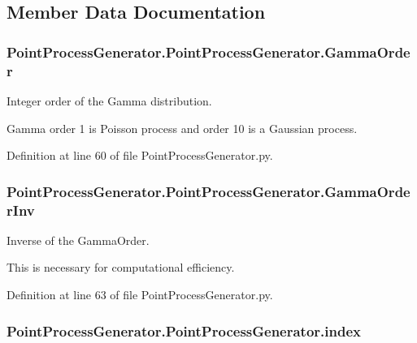 \subsection{Member Data Documentation}
\hypertarget{class_point_process_generator_1_1_point_process_generator_aa6c6513cd7f00dbdceb5f945a07cffee}{
\subsubsection[{Gamma\-Order}]{\setlength{\rightskip}{0pt plus 5cm}Point\-Process\-Generator.\-Point\-Process\-Generator.\-Gamma\-Order}}\label{class_point_process_generator_1_1_point_process_generator_aa6c6513cd7f00dbdceb5f945a07cffee}


Integer order of the Gamma distribution. 

Gamma order 1 is Poisson process and order 10 is a Gaussian process. 

Definition at line 60 of file Point\-Process\-Generator.\-py.

\hypertarget{class_point_process_generator_1_1_point_process_generator_aa70be756b1535ff4512affa05a732fda}{
\subsubsection[{Gamma\-Order\-Inv}]{\setlength{\rightskip}{0pt plus 5cm}Point\-Process\-Generator.\-Point\-Process\-Generator.\-Gamma\-Order\-Inv}}\label{class_point_process_generator_1_1_point_process_generator_aa70be756b1535ff4512affa05a732fda}


Inverse of the Gamma\-Order. 

This is necessary for computational efficiency. 

Definition at line 63 of file Point\-Process\-Generator.\-py.

\hypertarget{class_point_process_generator_1_1_point_process_generator_a57f6c8af8fd3d37ed8ab2f4abe9be5d8}{
\subsubsection[{index}]{\setlength{\rightskip}{0pt plus 5cm}Point\-Process\-Generator.\-Point\-Process\-Generator.\-index}}\label{class_point_process_generator_1_1_point_process_generator_a57f6c8af8fd3d37ed8ab2f4abe9be5d8}


